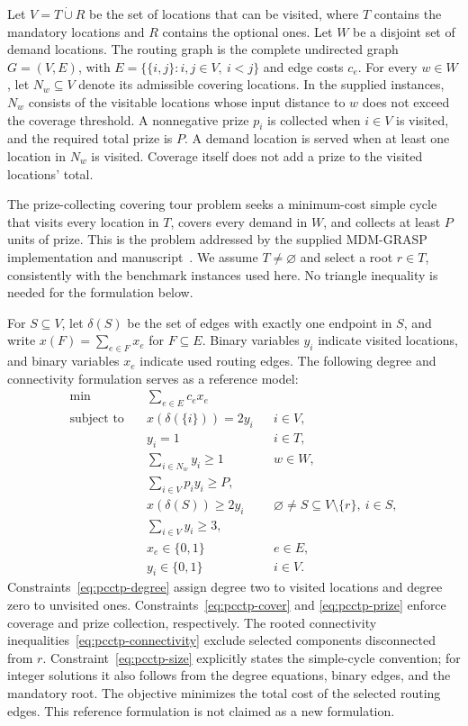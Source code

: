 Let $V=T\mathbin{\dot\cup}R$ be the set of locations that can be visited,
where $T$ contains the mandatory locations and $R$ contains the optional ones.
Let $W$ be a disjoint set of demand locations. The routing graph is the
complete undirected graph $G=(V,E)$, with $E=\{\{i,j\}:i,j\in V,\ i<j\}$
and edge costs $c_e$. For every $w\in W$, let $N_w\subseteq V$ denote
its admissible covering locations. In the supplied instances, $N_w$ consists
of the visitable locations whose input distance to $w$ does not exceed the
coverage threshold. A nonnegative prize $p_i$ is collected when $i\in V$
is visited, and the required total prize is $P$. A demand location is
served when at least one location in $N_w$ is visited. Coverage itself
does not add a prize to the visited locations' total.

The prize-collecting covering tour problem seeks a minimum-cost simple cycle
that visits every location in $T$, covers every demand in $W$, and collects
at least $P$ units of prize. This is the problem addressed by the supplied
MDM-GRASP implementation and manuscript~\cite{climaco2026mdm}.
We assume $T\ne\varnothing$ and select a root $r\in T$, consistently with
the benchmark instances used here. No triangle inequality is needed for
the formulation below.

For $S\subseteq V$, let $\delta(S)$ be the set of edges with exactly one
endpoint in $S$, and write $x(F)=\sum_{e\in F}x_e$ for $F\subseteq E$.
Binary variables $y_i$ indicate visited locations, and binary variables
$x_e$ indicate used routing edges. The following degree and connectivity
formulation serves as a reference model:
\begin{align}
 \min\quad &\sum_{e\in E}c_e x_e \label{eq:pcctp-objective}\\
 \text{subject to}\quad
 &x(\delta(\{i\}))=2y_i && i\in V,\label{eq:pcctp-degree}\\
 &y_i=1 &&i\in T,\label{eq:pcctp-mandatory}\\
 &\sum_{i\in N_w}y_i\ge1 &&w\in W,\label{eq:pcctp-cover}\\
 &\sum_{i\in V}p_i y_i\ge P,\label{eq:pcctp-prize}\\
 &x(\delta(S))\ge2y_i
 &&\varnothing\ne S\subseteq V\setminus\{r\},\ i\in S,
 \label{eq:pcctp-connectivity}\\
 &\sum_{i\in V}y_i\ge3,\label{eq:pcctp-size}\\
 &x_e\in\{0,1\} &&e\in E,\\
 &y_i\in\{0,1\} &&i\in V.
\end{align}
Constraints~\eqref{eq:pcctp-degree} assign degree two to visited locations
and degree zero to unvisited ones. Constraints~\eqref{eq:pcctp-cover} and
\eqref{eq:pcctp-prize} enforce coverage and prize collection, respectively.
The rooted connectivity inequalities~\eqref{eq:pcctp-connectivity} exclude
selected components disconnected from $r$. Constraint~\eqref{eq:pcctp-size}
explicitly states the simple-cycle convention; for integer solutions it also
follows from the degree equations, binary edges, and the mandatory root.
The objective minimizes the total cost of the selected routing edges.
This reference formulation is not claimed as a new formulation.

